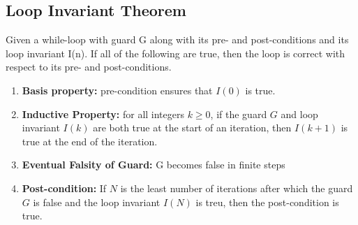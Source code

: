 \documentclass[8pt,landscape]{article}
\begin{document}
\begin{multicols*}{4}
		\subsection*{Loop Invariant Theorem}Given a while-loop with guard G along with its pre- and post-conditions and
		its loop invariant I(n). If all of the following are true, then the loop is correct with respect to its pre- and
		post-conditions.
		\begin{enumerate}[leftmargin=*]
			\item \textbf{Basis property:} pre-condition ensures that $I(0)$ is true.
			\item \textbf{Inductive Property:} for all integers $ k \geq 0$, if the guard $G$ and loop invariant $I(k)$ are both true at the start of an iteration, then $I(k + 1)$ is true at the end of the iteration.
			\item \textbf{Eventual Falsity of Guard:} G becomes false in finite steps
			\item \textbf{Post-condition:} If $N$ is the least number of iterations after which the guard $G$ is false and the loop invariant $I(N)$ is treu, then the post-condition is true.
		\end{enumerate}
	\end{multicols*}
\end{document}
